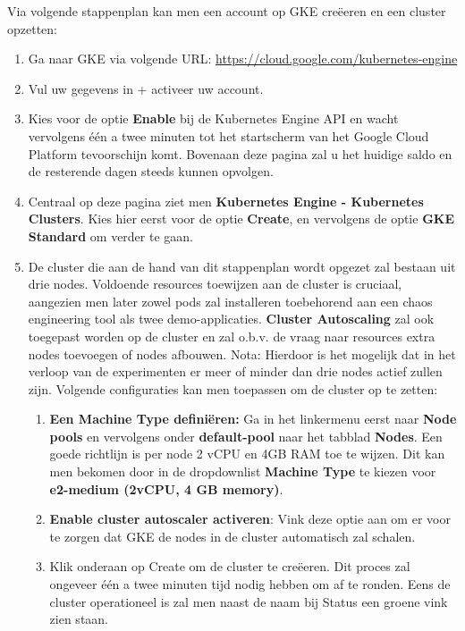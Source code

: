 Via volgende stappenplan kan men een account op GKE creëeren en een cluster opzetten: 
\begin{enumerate}
    \item Ga naar GKE via volgende URL: \url{https://cloud.google.com/kubernetes-engine}
    \item Vul uw gegevens in + activeer uw account.
    \item Kies voor de optie {\bf Enable} bij de Kubernetes Engine API en wacht vervolgens één a twee minuten tot het startscherm van het Google Cloud Platform tevoorschijn komt. Bovenaan deze pagina zal u het huidige saldo en de resterende dagen steeds kunnen opvolgen.
    \item Centraal op deze pagina ziet men {\bf Kubernetes Engine - Kubernetes Clusters}. Kies hier eerst voor de optie {\bf Create}, en vervolgens de optie {\bf GKE Standard} om verder te gaan. 
    \item De cluster die aan de hand van dit stappenplan wordt opgezet zal bestaan uit drie nodes. Voldoende resources toewijzen aan de cluster is cruciaal, aangezien men later zowel pods zal installeren toebehorend aan een chaos engineering tool als twee demo-applicaties. {\bf Cluster Autoscaling} zal ook toegepast worden op de cluster en zal o.b.v. de vraag naar resources extra nodes toevoegen of nodes afbouwen. \autocite{GKE2022} \newline Nota: Hierdoor is het mogelijk dat in het verloop van de experimenten er meer of minder dan drie nodes actief zullen zijn. 
    \newline Volgende configuraties kan men toepassen om de cluster op te zetten:
    \begin{enumerate}
        \item {\bf Een Machine Type definiëren:} Ga in het linkermenu eerst naar {\bf Node pools} en vervolgens onder {\bf default-pool} naar het tabblad {\bf Nodes}. Een goede richtlijn is per node 2 vCPU en 4GB RAM toe te wijzen. Dit kan men bekomen door in de dropdownlist {\bf Machine Type} te kiezen voor {\bf e2-medium (2vCPU, 4 GB memory)}.
        \item {\bf Enable cluster autoscaler activeren}: Vink deze optie aan om er voor 
        te zorgen dat GKE de nodes in de cluster automatisch zal schalen. 
        \item Klik onderaan op Create om de cluster te creëeren. Dit proces zal ongeveer één a twee minuten tijd nodig hebben om af te ronden. Eens de cluster operationeel is zal men naast de naam bij Status een groene vink zien staan.

\end{enumerate}
\end{enumerate}
